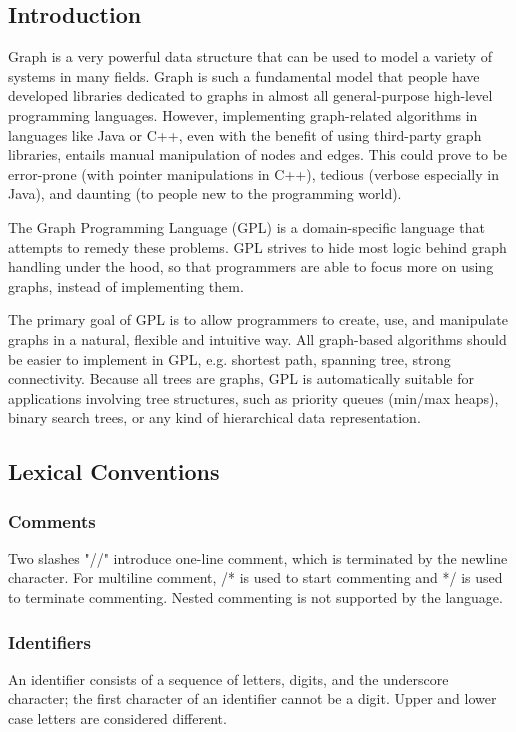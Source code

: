 \documentclass[a4paper,12pt]{article}
\begin{document}
\subsection{Introduction}
Graph is a very powerful data structure that can be used to model a variety of systems in many fields.  Graph is such a fundamental model that people have developed libraries dedicated to graphs in almost all general-purpose high-level programming languages.  However, implementing graph-related algorithms in languages like Java or C++, even with the benefit of using third-party graph libraries, entails manual manipulation of nodes and edges.  This could prove to be error-prone (with pointer manipulations in C++), tedious (verbose especially in Java), and daunting (to people new to the programming world).

The Graph Programming Language (GPL) is a domain-specific language that attempts to remedy these problems.  GPL strives to hide most logic behind graph handling under the hood, so that programmers are able to focus more on using graphs, instead of implementing them.

The primary goal of GPL is to allow programmers to create, use, and manipulate graphs in a natural, flexible and intuitive way. All graph-based algorithms should be easier to implement in GPL, e.g. shortest path, spanning tree, strong connectivity. Because all trees are graphs, GPL is automatically suitable for applications involving tree structures, such as priority queues (min/max heaps), binary search trees, or any kind of hierarchical data representation.

\subsection{Lexical Conventions}
\subsubsection{Comments}
Two slashes "//" introduce one-line comment, which is terminated by the newline character. For multiline comment, /* is used to start commenting and */ is used to terminate commenting. Nested commenting is not supported by the language.

\subsubsection{Identifiers}
An identifier consists of a sequence of letters, digits, and the underscore character; the first character of an identifier cannot be a digit. Upper and lower case letters are considered different.
\end{document}
